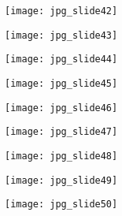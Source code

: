 \documentclass[main.tex]{subfiles}
\begin{document}
\begin{center}
\texttt{[image: jpg\_slide42]}
\end{center}

\begin{center}
\texttt{[image: jpg\_slide43]}
\end{center}

\begin{center}
\texttt{[image: jpg\_slide44]}
\end{center}

\begin{center}
\texttt{[image: jpg\_slide45]}
\end{center}

\begin{center}
\texttt{[image: jpg\_slide46]}
\end{center}

\begin{center}
\texttt{[image: jpg\_slide47]}
\end{center}

\begin{center}
\texttt{[image: jpg\_slide48]}
\end{center}

\begin{center}
\texttt{[image: jpg\_slide49]}
\end{center}

\begin{center}
\texttt{[image: jpg\_slide50]}
\end{center}
\end{document}
